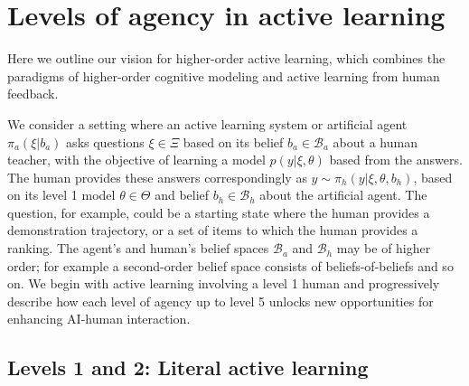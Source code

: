 \documentclass[letterpaper]{article} %
\begin{document}
\section{Levels of agency in active learning}

Here we outline our vision for higher-order active learning, which combines the paradigms of higher-order cognitive modeling and active learning from human feedback.

We consider a setting where an active learning system or artificial agent $\pi_a(\xi | b_a)$ asks questions $\xi \in \Xi$ based on its belief $b_a \in \mathcal{B}_a$ about a human teacher, with the objective of learning a model $p(y | \xi, \theta)$ based from the answers. The human provides these answers correspondingly as $y \sim \pi_{h}(y|\xi, \theta, b_h)$, based on its level 1 model $\theta \in \Theta$ and belief $b_h \in \mathcal{B}_h$ about the artificial agent. The question, for example, could be a starting state where the human provides a demonstration trajectory, or a set of items to which the human provides a ranking. The agent's and human's belief spaces $\mathcal{B}_a$ and $\mathcal{B}_h$ may be of higher order; for example a second-order belief space consists of beliefs-of-beliefs and so on. We begin with active learning involving a level 1 human and progressively describe how each level of agency up to level 5 unlocks new opportunities for enhancing AI-human interaction.

\subsection{Levels 1 and 2: Literal active learning}
\end{document}
